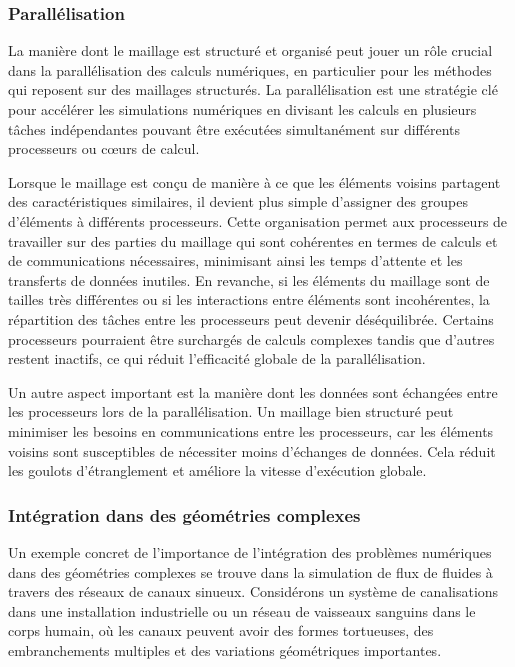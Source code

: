 \subsubsection{Parallélisation}

La manière dont le maillage est structuré et organisé peut jouer un rôle crucial dans la parallélisation des calculs numériques, en particulier pour les méthodes qui reposent sur des maillages structurés. La parallélisation est une stratégie clé pour accélérer les simulations numériques en divisant les calculs en plusieurs tâches indépendantes pouvant être exécutées simultanément sur différents processeurs ou cœurs de calcul.

Lorsque le maillage est conçu de manière à ce que les éléments voisins partagent des caractéristiques similaires, il devient plus simple d'assigner des groupes d'éléments à différents processeurs. Cette organisation permet aux processeurs de travailler sur des parties du maillage qui sont cohérentes en termes de calculs et de communications nécessaires, minimisant ainsi les temps d'attente et les transferts de données inutiles. En revanche, si les éléments du maillage sont de tailles très différentes ou si les interactions entre éléments sont incohérentes, la répartition des tâches entre les processeurs peut devenir déséquilibrée. Certains processeurs pourraient être surchargés de calculs complexes tandis que d'autres restent inactifs, ce qui réduit l'efficacité globale de la parallélisation.

Un autre aspect important est la manière dont les données sont échangées entre les processeurs lors de la parallélisation. Un maillage bien structuré peut minimiser les besoins en communications entre les processeurs, car les éléments voisins sont susceptibles de nécessiter moins d'échanges de données. Cela réduit les goulots d'étranglement et améliore la vitesse d'exécution globale.

\subsubsection{Intégration dans des géométries complexes}

Un exemple concret de l'importance de l'intégration des problèmes numériques dans des géométries complexes se trouve dans la simulation de flux de fluides à travers des réseaux de canaux sinueux. Considérons un système de canalisations dans une installation industrielle ou un réseau de vaisseaux sanguins dans le corps humain, où les canaux peuvent avoir des formes tortueuses, des embranchements multiples et des variations géométriques importantes.

